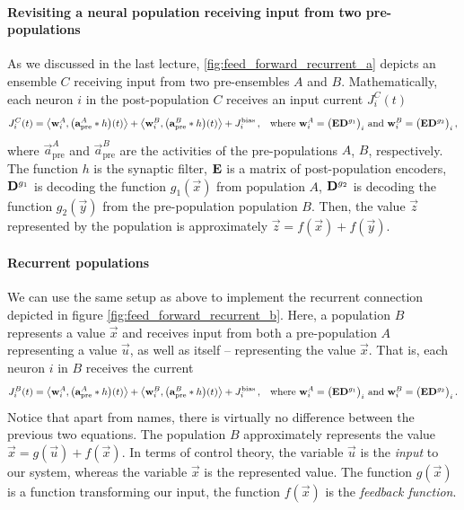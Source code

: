 \documentclass[10pt,letterpaper,oneside]{article}
\begin{document}

\paragraph{Revisiting a neural population receiving input from two pre-populations}
As we discussed in the last lecture, \cref{fig:feed_forward_recurrent_a} depicts an ensemble $C$ receiving input from two pre-ensembles $A$ and $B$. Mathematically, each neuron $i$ in the post-population $C$ receives an input current $J^C_i(t)$
\begin{align*}
	J^C_i(t) &= \big\langle {\mathbf{w}}_i^A , \big ( {\mathbf{a}}^{A}_\mathrm{pre} \ast h \big)(t) \big\rangle
	        + \big\langle {\mathbf{w}}_i^B , \big ( {\mathbf{a}}^{B}_\mathrm{pre} \ast h \big)(t) \big\rangle
	        + J^\mathrm{bias}_i \,,
	       & \text{where } {\mathbf{w}}^A_i = \big( {\mathbf{E}} {\mathbf{D}}^{g_1} \big)_i \text{ and } {\mathbf{w}}^B_i = \big( {\mathbf{E}} {\mathbf{D}}^{g_2} \big)_i \,,
\end{align*}
where $\vec a^{A}_\mathrm{pre}$ and $\vec a^{B}_\mathrm{pre}$ are the activities of the pre-populations $A$, $B$, respectively. The function $h$ is the synaptic filter, ${\mathbf{E}}$ is a matrix of post-population encoders, ${\mathbf{D}}^{g_1}$ is decoding the function $g_1(\vec x)$ from population $A$, ${\mathbf{D}}^{g_2}$ is decoding the function ${g_2}(\vec y)$ from the pre-population population $B$. Then, the value $\vec z$ represented by the population is approximately $\vec z = f(\vec x) + f(\vec y)$.

\paragraph{Recurrent populations}
We can use the same setup as above to implement the recurrent connection depicted in figure \cref{fig:feed_forward_recurrent_b}. Here, a population $B$ represents a value $\vec x$ and receives input from both a pre-population $A$ representing a value $\vec u$, as well as itself -- representing the value $\vec x$. That is, each neuron $i$ in $B$ receives the current
\begin{align*}
	J^B_i(t) &= \big\langle {\mathbf{w}}_i^A , \big ( {\mathbf{a}}^{A}_\mathrm{pre} \ast h \big)(t) \big\rangle
			+ \big\langle {\mathbf{w}}_i^B , \big ( {\mathbf{a}}^{B}_\mathrm{pre} \ast h \big)(t) \big\rangle
			+ J^\mathrm{bias}_i \,,
			& \text{where } {\mathbf{w}}^A_i = \big( {\mathbf{E}} {\mathbf{D}}^{g_1} \big)_i \text{ and } {\mathbf{w}}^B_i = \big( {\mathbf{E}} {\mathbf{D}}^{g_2} \big)_i \,.
\end{align*}
Notice that apart from names, there is virtually no difference between the previous two equations. The population $B$ approximately represents the value $\vec x = g(\vec u) + f(\vec x)$. In terms of control theory, the variable $\vec u$ is the \emph{input} to our system, whereas the variable $\vec x$ is the represented value. The function $g(\vec x)$ is a function transforming our input, the function $f(\vec x)$ is the \emph{feedback function}.
\end{document}
